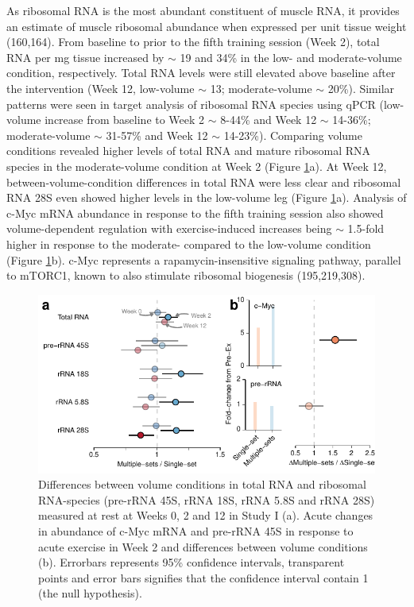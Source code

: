 \documentclass[twoside,10pt]{gihclass} %
\begin{document}
As ribosomal RNA is the most abundant constituent of muscle RNA, it provides an estimate of muscle ribosomal abundance when expressed per unit tissue weight
(160,164).
From baseline to prior to the fifth training session (Week 2), total RNA per mg tissue increased by \(\sim\) 19 and 34\% in the low- and moderate-volume condition, respectively. Total RNA levels were still elevated above baseline after the intervention (Week 12, low-volume \(\sim\) 13; moderate-volume \(\sim\) 20\%). Similar patterns were seen in target analysis of ribosomal RNA species using qPCR (low-volume increase from baseline to Week 2 \(\sim\) 8-44\% and Week 12 \(\sim\) 14-36\%; moderate-volume \(\sim\) 31-57\% and Week 12 \(\sim\) 14-23\%). Comparing volume conditions revealed higher levels of total RNA and mature ribosomal RNA species in the moderate-volume condition at Week 2 (Figure \ref{fig:rrna-fig}a). At Week 12, between-volume-condition differences in total RNA were less clear and ribosomal RNA 28S even showed higher levels in the low-volume leg (Figure \ref{fig:rrna-fig}a).
Analysis of c-Myc mRNA abundance in response to the fifth training session also showed volume-dependent regulation with exercise-induced increases being \(\sim\) 1.5-fold higher in response to the moderate- compared to the low-volume condition (Figure \ref{fig:rrna-fig}b). c-Myc represents a rapamycin-insensitive signaling pathway, parallel to mTORC1, known to also stimulate ribosomal biogenesis
(195,219,308).
\begin{figure}

{\centering \includegraphics{thesis_files/figure-latex/rrna-fig-1} 

}

\caption[Differences between volume conditions in total RNA and ribosomal RNA]{Differences between volume conditions in total RNA and ribosomal RNA-species (pre-rRNA 45S, rRNA 18S, rRNA 5.8S and rRNA 28S) measured at rest at Weeks 0, 2 and 12 in Study I (a). Acute changes in abundance of c-Myc mRNA and pre-rRNA 45S in response to acute exercise in Week 2 and differences between volume conditions (b). Errorbars represents 95\% confidence intervals, transparent points and error bars signifies that the confidence interval contain 1 (the null hypothesis).}\label{fig:rrna-fig}
\end{figure}
\end{document}
